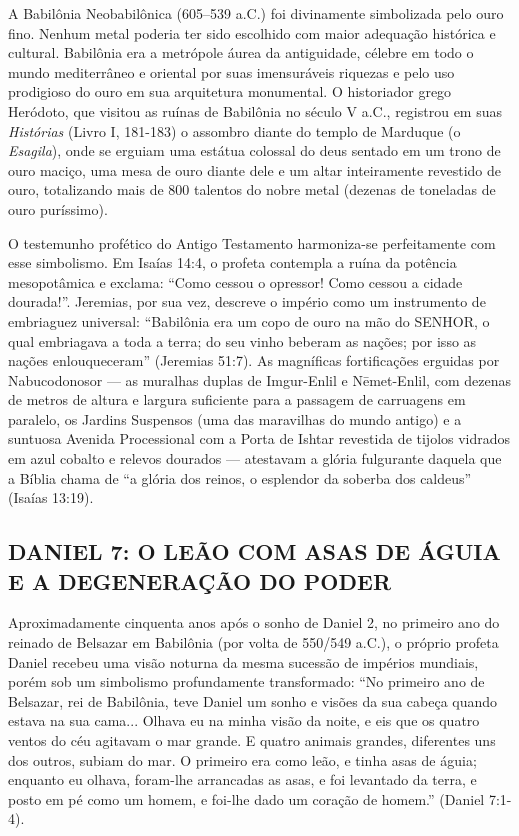 \documentclass[11pt,a4paper,openany]{book}
\begin{document}
A Babilônia Neobabilônica (605–539 a.C.) foi divinamente simbolizada pelo ouro fino. Nenhum metal poderia ter sido escolhido com maior adequação histórica e cultural. Babilônia era a metrópole áurea da antiguidade, célebre em todo o mundo mediterrâneo e oriental por suas imensuráveis riquezas e pelo uso prodigioso do ouro em sua arquitetura monumental. O historiador grego Heródoto, que visitou as ruínas de Babilônia no século V a.C., registrou em suas \textit{Histórias} (Livro I, 181-183) o assombro diante do templo de Marduque (o \textit{Esagila}), onde se erguiam uma estátua colossal do deus sentado em um trono de ouro maciço, uma mesa de ouro diante dele e um altar inteiramente revestido de ouro, totalizando mais de 800 talentos do nobre metal (dezenas de toneladas de ouro puríssimo).

O testemunho profético do Antigo Testamento harmoniza-se perfeitamente com esse simbolismo. Em Isaías 14:4, o profeta contempla a ruína da potência mesopotâmica e exclama: ``Como cessou o opressor! Como cessou a cidade dourada!''. Jeremias, por sua vez, descreve o império como um instrumento de embriaguez universal: ``Babilônia era um copo de ouro na mão do SENHOR, o qual embriagava a toda a terra; do seu vinho beberam as nações; por isso as nações enlouqueceram'' (Jeremias 51:7). As magníficas fortificações erguidas por Nabucodonosor — as muralhas duplas de Imgur-Enlil e Nēmet-Enlil, com dezenas de metros de altura e largura suficiente para a passagem de carruagens em paralelo, os Jardins Suspensos (uma das maravilhas do mundo antigo) e a suntuosa Avenida Processional com a Porta de Ishtar revestida de tijolos vidrados em azul cobalto e relevos dourados — atestavam a glória fulgurante daquela que a Bíblia chama de ``a glória dos reinos, o esplendor da soberba dos caldeus'' (Isaías 13:19).



\subsection{DANIEL 7: O LEÃO COM ASAS DE ÁGUIA E A DEGENERAÇÃO DO PODER}


Aproximadamente cinquenta anos após o sonho de Daniel 2, no primeiro ano do reinado de Belsazar em Babilônia (por volta de 550/549 a.C.), o próprio profeta Daniel recebeu uma visão noturna da mesma sucessão de impérios mundiais, porém sob um simbolismo profundamente transformado:
``No primeiro ano de Belsazar, rei de Babilônia, teve Daniel um sonho e visões da sua cabeça quando estava na sua cama... Olhava eu na minha visão da noite, e eis que os quatro ventos do céu agitavam o mar grande. E quatro animais grandes, diferentes uns dos outros, subiam do mar. O primeiro era como leão, e tinha asas de águia; enquanto eu olhava, foram-lhe arrancadas as asas, e foi levantado da terra, e posto em pé como um homem, e foi-lhe dado um coração de homem.'' (Daniel 7:1-4).
\end{document}
